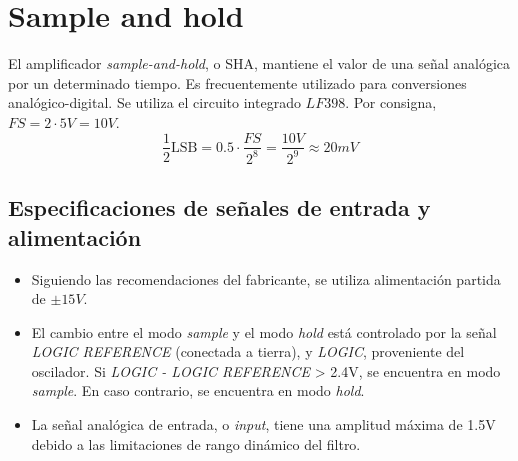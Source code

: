 \documentclass[../../ASSD_TP1_G7.tex]{subfiles}
\begin{document}
\chapter*{Sample and hold}
El amplificador \textit{sample-and-hold}, o SHA, mantiene el valor de una se\~nal anal\'ogica por un determinado tiempo. Es frecuentemente utilizado para conversiones anal\'ogico-digital. Se utiliza el circuito integrado $LF398$. Por consigna, $FS = 2\cdot 5V = 10V$.
\[\frac{1}{2}\text{LSB} = 0.5\cdot \frac{FS}{2^8} = \frac{10V}{2^9} \approx 20mV\]


\section{Especificaciones de se\~nales de entrada y alimentaci\'on}
\begin{itemize}
	\item Siguiendo las recomendaciones del fabricante, se utiliza alimentaci\'on partida de $\pm 15V$.
	\item El cambio entre el modo \textit{sample} y el modo \textit{hold} est\'a controlado por la se\~nal \textit{LOGIC REFERENCE} (conectada a tierra), y \textit{LOGIC}, proveniente del oscilador.  Si \textit{LOGIC - LOGIC REFERENCE} > 2.4V, se encuentra en modo \textit{sample}. En caso contrario, se encuentra en modo \textit{hold}.
	\item La se\~nal anal\'ogica de entrada, o \textit{input}, tiene una amplitud m\'axima de 1.5V debido a las limitaciones de rango din\'amico del filtro. 
\end{itemize}
\end{document}
